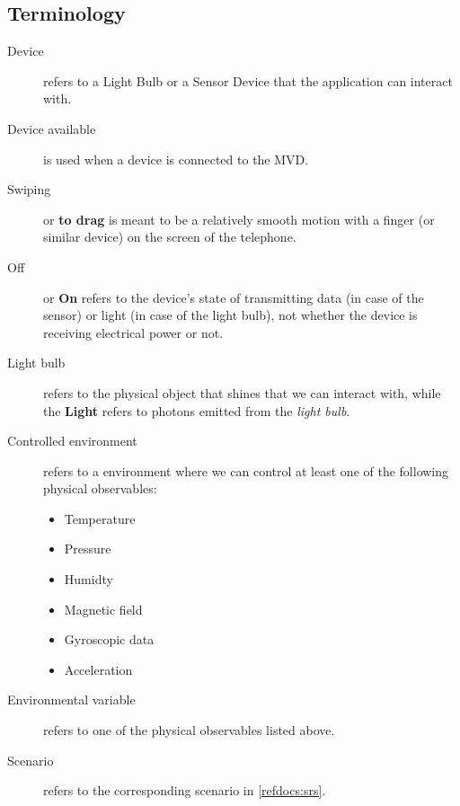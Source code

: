 \documentclass[a4paper]{article}
\begin{document}
\subsection{Terminology}
\begin{description}
\item[Device] refers to a Light Bulb or a Sensor Device that the application can interact with.
\item[Device available] is used when a device is connected to the MVD.
\item[Swiping] or \textbf{to drag} is meant to be a relatively smooth motion with a finger (or similar device) on the screen of the telephone.
\item[Off] or \textbf{On} refers to the device's state of transmitting data (in case of the sensor) or light (in case of the light bulb), not whether the device is receiving electrical power or not.
\item[Light bulb] refers to the physical object that shines that we can interact with, while the \textbf{Light} refers to photons emitted from the  \textit{light bulb}.
\item[Controlled environment] refers to a environment where we can control at least one of the following physical observables:
	\begin{itemize}
	\item Temperature
	\item Pressure
	\item Humidty
	\item Magnetic field
	\item Gyroscopic data
	\item Acceleration
	\end{itemize}
\item[Environmental variable] refers to one of the physical observables listed above.
\item[Scenario] refers to the corresponding scenario in \ref{refdocs:srs}.
\end{description}
\newpage
\end{document}
